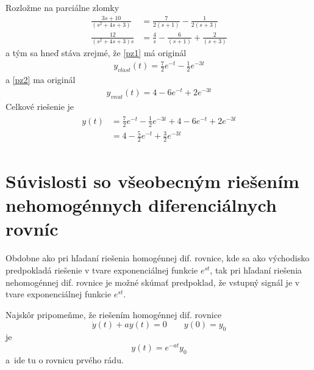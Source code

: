\documentclass[a4paper, 10pt, ]{article}
\begin{document}
Rozložme na parciálne zlomky
\begin{align}
    \frac{3s + 10}{\left( s^2   + 4s  + 3\right)} &= \frac{7}{2(s+1)} - \frac{1}{2(s+3)} \label{pz1} \\
    \frac{12}{\left( s^2   + 4s  + 3\right) s} &= \frac{4}{s} - \frac{6}{(s+1)} + \frac{2}{(s+3)} \label{pz2}
\end{align}
a tým sa hneď stáva zrejmé, že \eqref{pz1} má originál
\begin{align}
    y_{vlast}(t) = \frac{7}{2} e^{-t} - \frac{1}{2} e^{-3t}
\end{align}
a \eqref{pz2} ma originál
\begin{align}
    y_{vnut}(t) = 4 - 6 e^{-t} + 2 e^{-3t}
\end{align}
Celkové riešenie je
\begin{align}
    \begin{aligned}
        y(t) &= \frac{7}{2} e^{-t} - \frac{1}{2} e^{-3t} +  4 - 6 e^{-t} + 2 e^{-3t} \\
        &= 4 - \frac{5}{2} e^{-t} + \frac{3}{2} e^{-3t}
    \end{aligned}
\end{align}
















\section[Súvislosti so všeobecným riešením nehomogénnych diferenciálnych rovníc]{Súvislosti so všeobecným riešením\\ nehomogénnych diferenciálnych rovníc}
\label{predchcasttato}

Obdobne ako pri hľadaní riešenia homogénnej dif. rovnice, kde sa ako východisko predpokladá riešenie v tvare exponenciálnej funkcie $e^{s t}$, tak pri hľadaní riešenia nehomogénnej dif. rovnice je možné skúmať predpoklad, že vstupný signál je v tvare exponenciálnej funkcie $e^{s t}$. 




Najskôr pripomeňme, že riešením homogénnej dif. rovnice 
\begin{equation}
    \dot y(t) + a y(t) = 0 \qquad y(0) = y_0
\end{equation}
je
\begin{equation}
    y(t) =  e^{-a t} y_0
\end{equation}
a~ide tu o rovnicu prvého rádu. 
\end{document}
